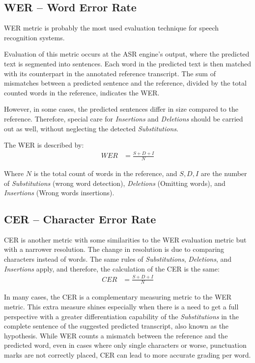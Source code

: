 \subsection{WER -- Word Error Rate}
WER\cite{KLAKOW200219} metric is probably the most used evaluation
technique for speech recognition systems.

Evaluation of this metric occurs at the ASR engine's output, 
where the predicted text is segmented into sentences. 
Each word in the predicted
text is then matched with its counterpart in the 
annotated reference transcript. 
The sum of mismatches between a predicted sentence and the reference, 
divided by the total counted words in the reference, indicates the WER.

However, in some cases, the predicted sentences differ in size compared
to the reference. Therefore, special care for \emph{Insertions}
and \emph{Deletions} should be carried out as well, without neglecting
the detected \emph{Substitutions}.

The WER is described by:
\begin{align}
    WER & = \frac{S + D + I}{N}
\end{align}

Where \(N\) is the total count of words in the reference,
and \(S,D,I\) are the number of \emph{Substitutions} (wrong word detection),
\emph{Deletions} (Omitting words),
and \emph{Insertions} (Wrong words insertions).

\subsection{CER -- Character Error Rate}
CER is another metric with some similarities to the 
WER evaluation metric but with a narrower resolution.
The change in resolution is due to comparing characters instead of words.
The same rules of \emph{Substitutions}, \emph{Deletions}, and \emph{Insertions}
apply, and therefore, the calculation of the CER is the same:
\begin{align}
    CER & = \frac{S + D + I}{N}
\end{align}

In many cases, the CER\cite{_isword} is a complementary 
measuring metric to the WER
metric.
This extra measure shines especially 
when there is a need to get a full perspective 
with a greater differentiation capability of the 
\emph{Substitutions} in the complete sentence 
of the suggested predicted transcript,
 also known as the hypothesis. 
While WER counts a mismatch between the reference and the predicted 
word, even in cases where only single characters or worse, 
punctuation marks are not correctly placed, CER can lead to 
more accurate grading per word.

